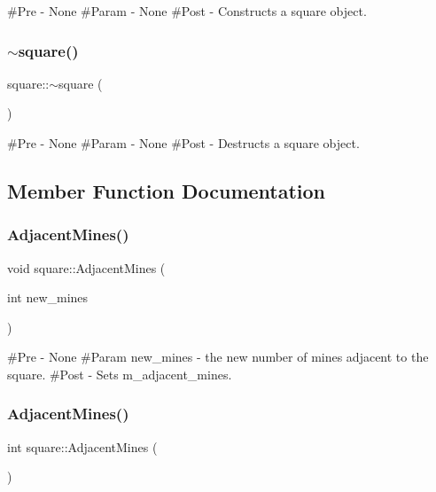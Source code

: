 \#\+Pre -\/ None \#\+Param -\/ None \#\+Post -\/ Constructs a square object. \mbox{\label{classsquare_ab29ccc5385134eb07dadb0ef0f3417b6}} 
\subsubsection{\texorpdfstring{$\sim$square()}{~square()}}
{\footnotesize\ttfamily square\+::$\sim$square (\begin{DoxyParamCaption}{ }\end{DoxyParamCaption})}

\#\+Pre -\/ None \#\+Param -\/ None \#\+Post -\/ Destructs a square object. 

\subsection{Member Function Documentation}
\mbox{\label{classsquare_a25e18a690d8096805b4ddcb97dbbf642}} 
\subsubsection{\texorpdfstring{AdjacentMines()}{AdjacentMines()}\hspace{0.1cm}{\footnotesize\ttfamily [1/2]}}
{\footnotesize\ttfamily void square\+::\+Adjacent\+Mines (\begin{DoxyParamCaption}\item[{int}]{new\+\_\+mines }\end{DoxyParamCaption})}

\#\+Pre -\/ None \#\+Param new\+\_\+mines -\/ the new number of mines adjacent to the square. \#\+Post -\/ Sets m\+\_\+adjacent\+\_\+mines. \mbox{\label{classsquare_a168cd493b64467001a305ca1298b91f5}} 
\subsubsection{\texorpdfstring{AdjacentMines()}{AdjacentMines()}\hspace{0.1cm}{\footnotesize\ttfamily [2/2]}}
{\footnotesize\ttfamily int square\+::\+Adjacent\+Mines (\begin{DoxyParamCaption}{ }\end{DoxyParamCaption})}

